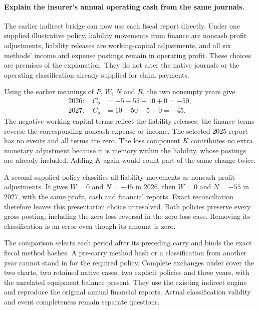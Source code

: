\paragraph{Explain the insurer's annual operating cash from the same journals.}
The earlier indirect bridge can now use each fiscal report directly. Under one
supplied illustrative policy, liability movements from finance are noncash
profit adjustments, liability releases are working-capital adjustments, and
all six methods' income and expense postings remain in operating profit.
These choices are premises of the explanation. They do not alter the native
journals or the operating classification already supplied for claim payments.

Using the earlier meanings of $P$, $W$, $N$ and $R$, the two nonempty years give
\[
\begin{aligned}
  2026:\quad C_o&=-5-55+10+0=-50,\\
  2027:\quad C_o&=10-50-5+0=-45.
\end{aligned}
\]
The negative working-capital terms reflect the liability releases; the finance
terms reverse the corresponding noncash expense or income. The selected 2025
report has no events and all terms are zero. The loss component $K$ contributes
no extra monetary adjustment because it is memory within the liability,
whose postings are already included. Adding $K$ again would count part of the
same change twice.

A second supplied policy classifies all liability movements as noncash profit
adjustments. It gives $W=0$ and $N=-45$ in 2026, then $W=0$ and $N=-55$ in
2027, with the same profit, cash and financial reports. Exact reconciliation
therefore leaves this presentation choice unresolved. Both policies preserve
every gross posting, including the zero loss reversal in the zero-loss case.
Removing its classification is an error even though its amount is zero.

The comparison selects each period after its preceding carry and binds the
exact fiscal method hashes. A pre-carry method hash or a classification from
another year cannot stand in for the required policy. Complete exchanges under
 cover the
two charts, two retained native cases, two explicit policies and three years,
with the unrelated equipment balance present. They use the existing indirect
engine and reproduce the original annual financial reports. Actual
classification validity and event completeness remain separate questions.
